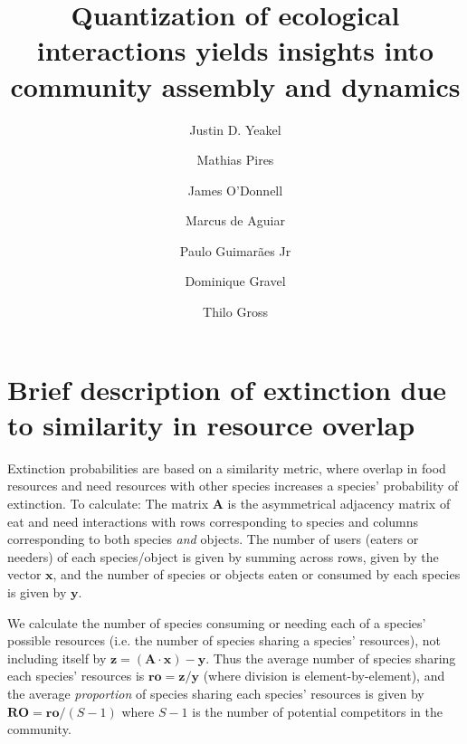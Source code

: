 \documentclass[onecolumn,preprintnumbers,amsmath,amssymb,superscriptaddress]{revtex4}
\begin{document}
\author{Justin D. Yeakel} 

\author{Mathias Pires} \affiliation{}

\author{James O'Donnell} \affiliation{}

\author{Marcus de Aguiar} \affiliation{}

\author{Paulo Guimar\~aes Jr} \affiliation{}

\author{Dominique Gravel} \affiliation{}

\author{Thilo Gross} \affiliation{}

\title{Quantization of ecological interactions yields insights into community assembly and dynamics}

\section{Brief description of extinction due to similarity in resource overlap}

Extinction probabilities are based on a similarity metric, where overlap in food resources and need resources with other species increases a species' probability of extinction.
To calculate: The matrix $\bm{A}$ is the asymmetrical adjacency matrix of eat and need interactions with rows corresponding to species and columns corresponding to both species \emph{and} objects.
The number of users (eaters or needers) of each species/object is given by summing across rows, given by the vector $\bm{x}$, and the number of species or objects eaten or consumed by each species is given by $\bm{y}$.

We calculate the number of species consuming or needing each of a species' possible resources (i.e. the number of species sharing a species' resources), not including itself by $\bm{z} = (\bm{A}\cdot\bm{x}) - \bm{y}$.
Thus the average number of species sharing each species' resources is 
$\bm{ro} = \bm{z}/\bm{y}$ (where division is element-by-element), and the average \emph{proportion} of species sharing each species' resources is given by ${\bm{RO}} = \bm{ro}/(S-1)$ where $S-1$ is the number of potential competitors in the community.
\end{document}
